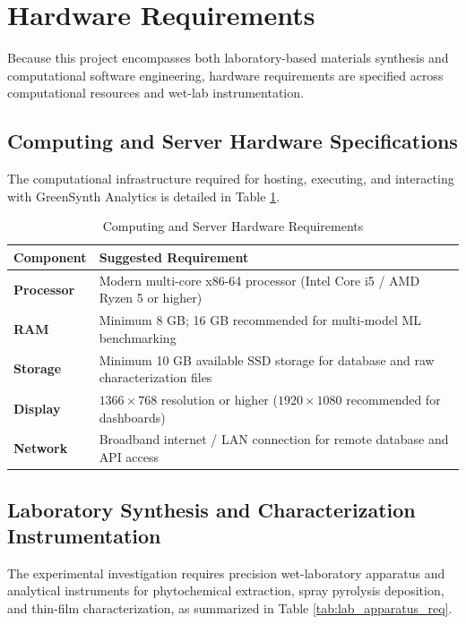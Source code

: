 \documentclass[12pt,a4paper,oneside]{report}
\begin{document}
{{{\section{Hardware Requirements}

Because this project encompasses both laboratory-based materials synthesis and computational software engineering, hardware requirements are specified across computational resources and wet-lab instrumentation.

\subsection{Computing and Server Hardware Specifications}

The computational infrastructure required for hosting, executing, and interacting with GreenSynth Analytics is detailed in Table \ref{tab:compute_hw_req}.

\begin{table}[h!]
\centering
\caption{Computing and Server Hardware Requirements}
\label{tab:compute_hw_req}
\begin{tabular}{|p{3.5cm}|p{11.0cm}|}
\hline
\textbf{Component} & \textbf{Suggested Requirement} \\
\hline
\textbf{Processor} & Modern multi-core x86-64 processor (Intel Core i5 / AMD Ryzen 5 or higher) \\
\hline
\textbf{RAM} & Minimum 8 GB; 16 GB recommended for multi-model ML benchmarking \\
\hline
\textbf{Storage} & Minimum 10 GB available SSD storage for database and raw characterization files \\
\hline
\textbf{Display} & $1366 \times 768$ resolution or higher ($1920 \times 1080$ recommended for dashboards) \\
\hline
\textbf{Network} & Broadband internet / LAN connection for remote database and API access \\
\hline
\end{tabular}
\end{table}

\subsection{Laboratory Synthesis and Characterization Instrumentation}

The experimental investigation requires precision wet-laboratory apparatus and analytical instruments for phytochemical extraction, spray pyrolysis deposition, and thin-film characterization, as summarized in Table \ref{tab:lab_apparatus_req}.

}}}
\end{document}
